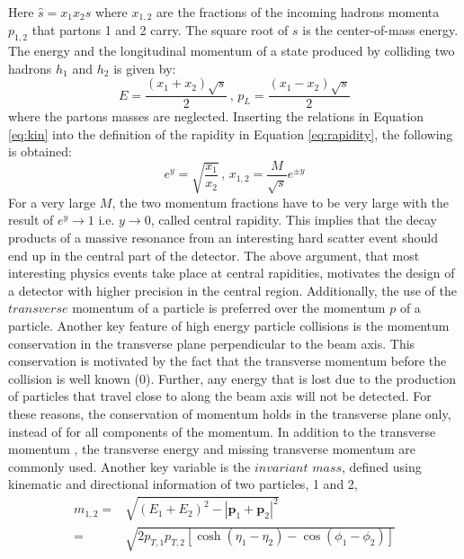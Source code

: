 Here $\hat{s}=x_{1}x_{2}s$ where $x_{1,2}$ are the fractions of the incoming hadrons momenta $p_{1,2}$ that partons 1 and 2 carry. 
The square root of $s$ is the center-of-mass energy. 
The energy and the longitudinal momentum of a state produced by colliding two hadrons $h_{1}$ and $h_{2}$ is given by:
\begin{equation}
E=\frac{(x_{1}+x_{2})\sqrt{s}}{2}\, , \, p_{L}=\frac{(x_{1}-x_{2})\sqrt{s}}{2}
\label{eq:kin}
\end{equation}
where the partons masses are neglected. 
Inserting the relations in Equation \ref{eq:kin} into the definition of the rapidity in Equation \ref{eq:rapidity}, the following is obtained:
\begin{equation}
e^{y}=\sqrt{\frac{x_{1}}{x_{2}}}\, , \,x_{1,2}=\frac{M}{\sqrt{s}}e^{\pm y}
\end{equation}
For a very large $M$, the two momentum fractions have to be very large with the result of $e^{y}\rightarrow 1$ i.e. $y\rightarrow 0$, called central rapidity. 
This implies that the decay products of a massive resonance from an interesting hard scatter event should end up in the central part of the detector. 
\newpara
\noindent\justify
The above argument, that most interesting physics events take place at central rapidities, motivates the design of a detector with higher precision in the central region.
Additionally, the use of the $transverse$ momentum \pt of a particle is preferred over the momentum $p$ of a particle. 
Another key feature of high energy particle collisions is the momentum conservation in the transverse plane perpendicular to the beam axis.
This conservation is motivated by the fact that the transverse momentum before the collision is well known (0). 
Further, any energy that is lost due to the production of particles that travel close to along the beam axis will not be detected. 
For these reasons, the conservation of momentum holds in the transverse plane only, instead of for all components of the momentum. 
In addition to the transverse momentum \pt, the transverse energy \ET and missing transverse momentum \ptmiss are commonly used.
\newpara
\noindent\justify
Another key variable is the $invariant$ $mass$, defined using kinematic and directional information of two particles, 1 and 2,
\begin{align} 
m_{1,2}=&\sqrt{(E_{1}+E_{2})^{2}-|\mathbf{p}_{1}+\mathbf{p}_{2}|^{2}}\\
    =&\sqrt{2p_{T,1}p_{T,2}[\cosh(\eta_{1}-\eta_{2})-\cos(\phi_{1}-\phi_{2})]} 
\end{align} 
